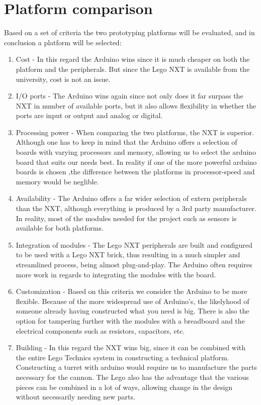 \section{Platform comparison}
Based on a set of criteria the two prototyping platforms will be evaluated, and
in conclusion a platform will be selected:

\begin{enumerate}
  \item Cost - In this regard the Arduino wins since it is much cheaper on both
  the platform and the peripherals. But since the Lego NXT is available from the
  university, cost is not an issue.
  \item I/O ports - The Arduino wins again since not only does it far surpass
  the NXT in number of available ports, but it also allows flexibility in
  whether the ports are input or output and analog or digital.
  \item Processing power - When comparing the two
  platforms, the NXT is superior. Although one has to keep in mind that the
  Arduino offers a selection of boards with varying processors and memory,
  allowing us to select the arduino board that suits our needs best. In reality
  if one of the more powerful arduino boards is chosen ,the difference between the platforms
  in processor-speed and memory would be neglible.
  \item Availability - The Arduino offers a far wider selection of extern
  peripherals than the NXT, although everything is produced by a 3rd party
  manufacturer.
  In reality, most of the modules needed for the project such as sensors is
  available for both platforms.
  \item Integration of modules - The Lego NXT peripherals are built and
  configured to be used with a Lego NXT brick, thus resulting in a much simpler
  and streamlined process, being almost plug-and-play. The Arduino often
  requires more work in regards to integrating the modules with the board.
  \item Customization - Based on this criteria we consider the Arduino to be
  more flexible. Because of the more widespread use of Arduino's, the
  likelyhood of someone already having constructed what you need is big. There
  is also the option for tampering further with the modules with a breadboard
  and the electrical components such as resistors, capacitors, etc.
  \item Building - In this regard the NXT wins big, since it can be combined
  with the entire Lego Technics system in constructing a technical platform.
  Constructing a turret with arduino would require us to manufacture the parts
  necessary for the cannon. The Lego also has the advantage that the various
  pieces can be combined in a lot of ways, allowing change in the design
  without necessarily needing new parts.
\end{enumerate}

